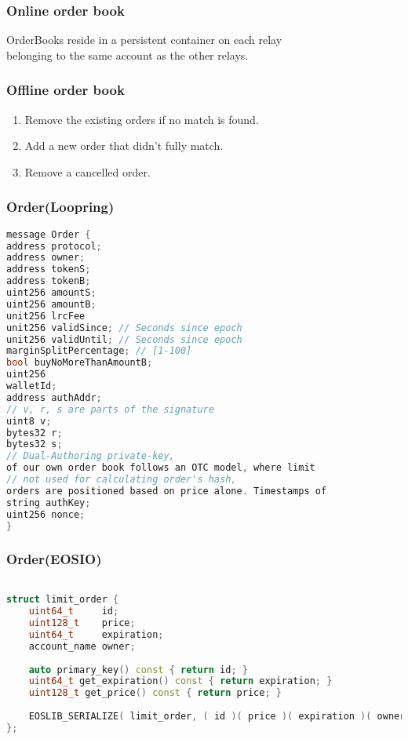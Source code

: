 \documentclass[]{article}
\begin{document}
\subsubsection{Online order book}
OrderBooks reside in a persistent container on each relay\\
belonging to the same account as the other relays.
\subsubsection{Offline order book}
\begin{enumerate}
	\item Remove the existing orders if no match is found.
	\item Add a new order that didn't fully match.
	\item Remove a cancelled order.
\end{enumerate}

\subsubsection{Order(Loopring)}
\begin{lstlisting}[language=C++, caption={C++ code using listings}]
message Order {
address protocol;
address owner;
address tokenS;
address tokenB;
uint256 amountS;
uint256 amountB;
unit256 lrcFee
unit256 validSince; // Seconds since epoch
unit256 validUntil; // Seconds since epoch
marginSplitPercentage; // [1-100]
bool buyNoMoreThanAmountB;
uint256
walletId;
address authAddr;
// v, r, s are parts of the signature
uint8 v;
bytes32 r;
bytes32 s;
// Dual-Authoring private-key,
of our own order book follows an OTC model, where limit
// not used for calculating order's hash,
orders are positioned based on price alone. Timestamps of
string authKey;
uint256 nonce;
}

\end{lstlisting}

\subsubsection{Order(EOSIO)}
\begin{lstlisting}[language=C++, caption={C++ code using listings}]

struct limit_order {
	uint64_t     id;
	uint128_t    price;
	uint64_t     expiration;
	account_name owner;
	
	auto primary_key() const { return id; }
	uint64_t get_expiration() const { return expiration; }
	uint128_t get_price() const { return price; }
	
	EOSLIB_SERIALIZE( limit_order, ( id )( price )( expiration )( owner ) )
};

\end{lstlisting}
\end{document}
